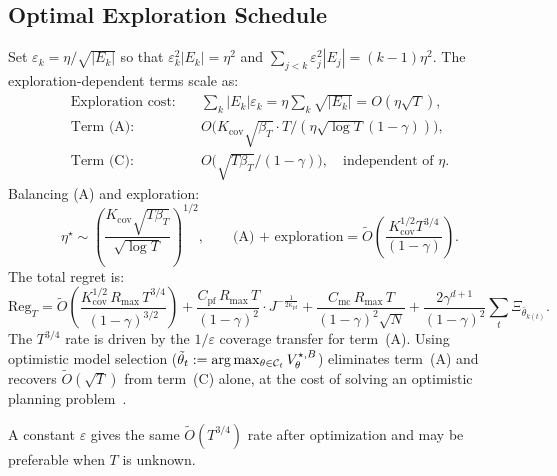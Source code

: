\subsection{Optimal Exploration Schedule}
\label{app:exploration_schedule}

Set $\varepsilon_k=\eta/\sqrt{|E_k|}$ so that $\varepsilon_k^2|E_k|=\eta^2$ and $\sum_{j<k}\varepsilon_j^2|E_j|=(k-1)\eta^2$. The exploration-dependent terms scale as:
\begin{align*}
\text{Exploration cost:}&\quad \textstyle\sum_k|E_k|\varepsilon_k=\eta\sum_k\sqrt{|E_k|}=O(\eta\sqrt{T}),\\
\text{Term (A):}&\quad O\bigl(K_{\mathrm{cov}}\sqrt{\beta_T}\cdot T/(\eta\sqrt{\log T}(1-\gamma))\bigr),\\
\text{Term (C):}&\quad O\bigl(\sqrt{T\beta_T}/(1-\gamma)\bigr), \quad\text{independent of }\eta.
\end{align*}
Balancing (A) and exploration:
\[
\eta^\star\sim\left(\frac{K_{\mathrm{cov}}\sqrt{T\beta_T}}{\sqrt{\log T}}\right)^{1/2},
\qquad
\text{(A) + exploration} = \widetilde O\!\left(\frac{K_{\mathrm{cov}}^{1/2}T^{3/4}}{(1-\gamma)}\right).
\]
The total regret is:
\begin{equation}\label{eq:eps_schedule}
\mathrm{Reg}_T = \widetilde O\!\left(\frac{K_{\mathrm{cov}}^{1/2}\,R_{\max}\,T^{3/4}}{(1-\gamma)^{3/2}}\right) + \frac{C_{\mathrm{pf}}\,R_{\max}\,T}{(1-\gamma)^2}\cdot J^{-\frac{1}{2\kappa_{\mathrm{pf}}}} + \frac{C_{\mathrm{mc}}\,R_{\max}\,T}{(1-\gamma)^2\sqrt{N}} + \frac{2\gamma^{d+1}}{(1-\gamma)^2}\sum_t\Xi_{\bar\theta_{k(t)}}.
\end{equation}
The $T^{3/4}$ rate is driven by the $1/\varepsilon$ coverage transfer for term~(A). Using optimistic model selection ($\tilde\theta_t:=\arg\max_{\theta\in{\mathcal{C}}_t}V_\theta^{\star,B}$) eliminates term~(A) and recovers $\widetilde O(\sqrt{T})$ from term~(C) alone, at the cost of solving an optimistic planning problem~\citep{liu2023optimistic}.

A constant $\varepsilon$ gives the same $\widetilde O(T^{3/4})$ rate after optimization and may be preferable when $T$ is unknown.




